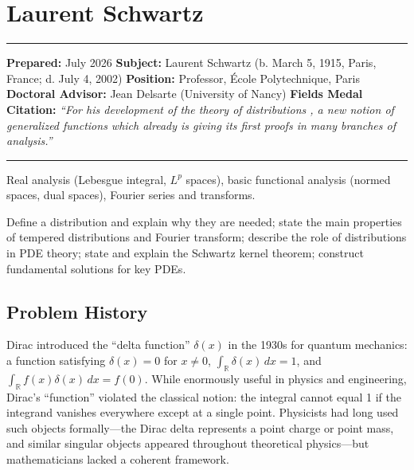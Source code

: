 \chapter{Laurent Schwartz}\label{ch1950laurentschwartz:laurent-schwartz-fields-medal-1950-a-comprehensive-report}

\begin{center}\rule{0.5\linewidth}{0.5pt}\end{center}

\textbf{Prepared:} July 2026 \textbf{Subject:} Laurent Schwartz (b. March 5,
1915, Paris, France; d. July 4, 2002) \textbf{Position:} Professor, \'Ecole
Polytechnique, Paris \textbf{Doctoral Advisor:} Jean Delsarte
(University of Nancy) \textbf{Fields Medal Citation:} \emph{``For his
development of the theory of distributions \cite{schwartz1951}, a new notion of
generalized functions which already is giving its first proofs in many
branches of analysis.''}

\begin{center}\rule{0.5\linewidth}{0.5pt}\end{center}

\begin{prereqs} Real analysis (Lebesgue integral, $L^p$ spaces), basic functional analysis (normed spaces, dual spaces), Fourier series and transforms. \end{prereqs}

\begin{objectives} Define a distribution and explain why they are needed; state the main properties of tempered distributions and Fourier transform; describe the role of distributions in PDE theory; state and explain the Schwartz kernel theorem; construct fundamental solutions for key PDEs. \end{objectives}

\section{Problem History}

Dirac introduced the ``delta function'' $\delta(x)$ in the 1930s for quantum mechanics: a function satisfying $\delta(x) = 0$ for $x \neq 0$, $\int_{\mathbb{R}} \delta(x) \, dx = 1$, and $\int_{\mathbb{R}} f(x) \delta(x) \, dx = f(0)$. While enormously useful in physics and engineering, Dirac's ``function'' violated the classical notion: the integral cannot equal 1 if the integrand vanishes everywhere except at a single point. Physicists had long used such objects formally---the Dirac delta represents a point charge or point mass, and similar singular objects appeared throughout theoretical physics---but mathematicians lacked a coherent framework.

